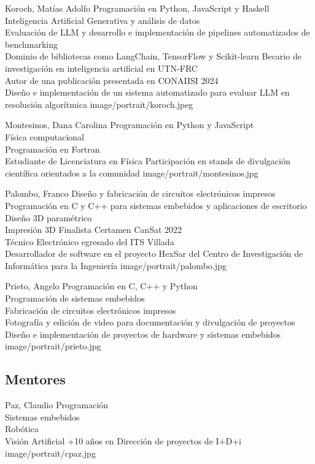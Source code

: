 \presentacion
  {Koroch, Matías Adolfo}
  {Programación en Python, JavaScript y Haskell\\Inteligencia Artificial Generativa y análisis de datos\\Evaluación de LLM y desarrollo e implementación de pipelines automatizados de benchmarking\\Dominio de bibliotecas como LangChain, TensorFlow y Scikit-learn}
  {Becario de investigación en inteligencia artificial en UTN-FRC\\Autor de una publicación presentada en CONAIISI 2024\\Diseño e implementación de un sistema automatizado para evaluar LLM en resolución algorítmica}
  {image/portrait/koroch.jpeg}

\presentacion
  {Montesinos, Dana Carolina}
  {Programación en Python y JavaScript\\Física computacional\\Programación en Fortran\\Estudiante de Licenciatura en Física}
  {Participación en stands de divulgación científica orientados a la comunidad}
  {image/portrait/montesinos.jpg}

\presentacion
  {Palombo, Franco}
  {Diseño y fabricación de circuitos electrónicos impresos\\Programación en C y C++ para sistemas embebidos y aplicaciones de escritorio\\Diseño 3D paramétrico\\Impresión 3D}
  {Finalista Certamen CanSat 2022\\Técnico Electrónico egresado del ITS Villada\\Desarrollador de software en el proyecto HexSar del Centro de Investigación de Informática para la Ingeniería}
  {image/portrait/palombo.jpg}

\presentacion
  {Prieto, Angelo}
  {Programación en C, C++ y Python\\Programación de sistemas embebidos\\Fabricación de circuitos electrónicos impresos\\Fotografía y edición de video para documentación y divulgación de proyectos}
  {Diseño e implementación de proyectos de hardware y sistemas embebidos}
  {image/portrait/prieto.jpg}

\subsection{Mentores}
\presentacion
  {Paz, Claudio}
  {Programación\\Sistemas embebidos\\Robótica\\Visión Artificial}
  {+10 años en Dirección de proyectos de I+D+i}
  {image/portrait/cpaz.jpg}

